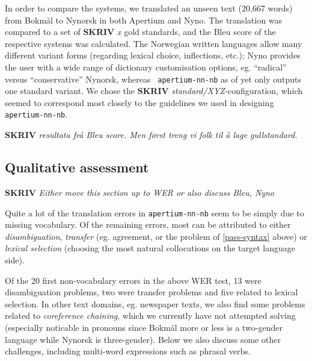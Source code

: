 \documentclass[11pt]{article}
\newcommand{\comment}[1]{\textbf{SKRIV} {\it #1}}
\begin{document}
In order to compare the systems, we translated an unseen text (20,667
words) from Bokmål to Nynorsk in both Apertium and Nyno. The
translation was compared to a set of \comment{x} gold standards, and
the {\sc Bleu} score \citep{papineni2001bleu} of the respective
systems was calculated. The Norwegian written languages allow many
different variant forms (regarding lexical choice, inflections, etc.);
Nyno provides the user with a wide range of dictionary customisation
options, eg. ``radical'' versus ``conservative'' Nynorsk, whereas {\tt
  apertium-nn-nb} as of yet only outputs one standard variant. We
chose the \comment{standard/XYZ-}configuration, which seemed to
correspond most closely to the guidelines we used in designing {\tt
  apertium-nn-nb}.

\comment{resultata frå Bleu score. Men først treng vi folk til å lage gullstandard.}

\subsection{Qualitative assessment}
\comment{Either move this section up to WER or also discuss Bleu, Nyno}

Quite a lot of the translation errors in {\tt apertium-nn-nb} seem to be
simply due to missing vocabulary. Of the remaining errors, most can be
attributed to either \emph{disambiguation}, \emph{transfer} (eg.
agreement, or the problem of \ref{pass-syntax} above) or \emph{lexical
  selection} (choosing the most natural collocations on the target
language side).

Of the 20 first non-vocabulary errors in the above WER test, 13 were
disambiguation problems, two were transfer problems and five related
to lexical selection. In other text domains, eg. newspaper texts, we
also find some problems related to \emph{coreference chaining}, which
we currently have not attempted solving (especially noticable in
pronouns since Bokmål more or less is a two-gender language while
Nynorsk is three-gender). Below we also discuss some other challenges,
including multi-word expressions such as phrasal verbs.
\end{document}

